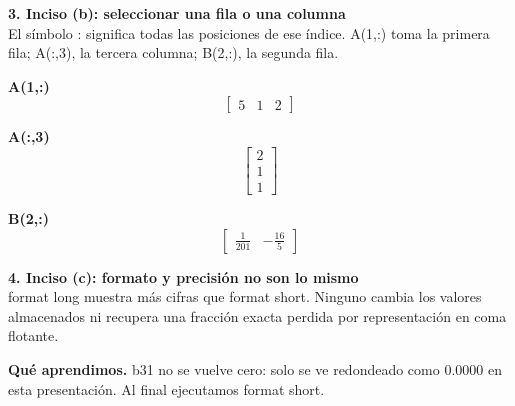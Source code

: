 \documentclass[11pt,a4paper,landscape]{article}
\begin{document}
\noindent\begin{minipage}{\linewidth}\textbf{3. Inciso (b): seleccionar una fila o una columna}\\[2pt]El símbolo : significa todas las posiciones de ese índice. A(1,:) toma la primera fila; A(:,3), la tercera columna; B(2,:), la segunda fila.
\par\smallskip \begin{minipage}[t]{.47\linewidth}\centering \textbf{A(1,:)}\[\begin{bmatrix}5 & 1 & 2\end{bmatrix}\]\end{minipage}\hfill\begin{minipage}[t]{.47\linewidth}\centering \textbf{A(:,3)}\[\begin{bmatrix}2\\1\\1\end{bmatrix}\]\end{minipage}\par\smallskip
\par\smallskip \begin{minipage}[t]{.47\linewidth}\centering \textbf{B(2,:)}\[\begin{bmatrix}\frac{1}{201} & - \frac{16}{5}\end{bmatrix}\]\end{minipage}\par\smallskip
\end{minipage}\par\medskip
\noindent\begin{minipage}{\linewidth}\textbf{4. Inciso (c): formato y precisión no son lo mismo}\\[2pt]format long muestra más cifras que format short. Ninguno cambia los valores almacenados ni recupera una fracción exacta perdida por representación en coma flotante.
\par{}\par\smallskip
\par\smallskip\textbf{Qué aprendimos.} b31 no se vuelve cero: solo se ve redondeado como 0.0000 en esta presentación. Al final ejecutamos format short.
\end{minipage}\par\medskip
\end{document}
